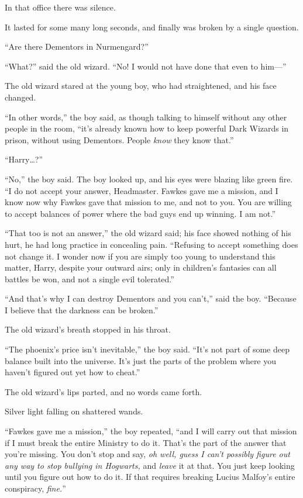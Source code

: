 In that office there was silence.

It lasted for some many long seconds, and finally was broken by a single question.

“Are there Dementors in Nurmengard?”

“What?” said the old wizard. “No! I would not have done that even to him—”

\later

The old wizard stared at the young boy, who had straightened, and his face changed.

“In other words,” the boy said, as though talking to himself without any other people in the room, “it’s already known how to keep powerful Dark Wizards in prison, without using Dementors. People \emph{know} they know that.”

“Harry…?”

“No,” the boy said. The boy looked up, and his eyes were blazing like green fire. “I do not accept your answer, Headmaster. Fawkes gave me a mission, and I know now why Fawkes gave that mission to me, and not to you. You are willing to accept balances of power where the bad guys end up winning. I am not.”

“That too is not an answer,” the old wizard said; his face showed nothing of his hurt, he had long practice in concealing pain. “Refusing to accept something does not change it. I wonder now if you are simply too young to understand this matter, Harry, despite your outward airs; only in children’s fantasies can all battles be won, and not a single evil tolerated.”

“And that’s why I can destroy Dementors and you can’t,” said the boy. “Because I believe that the darkness can be broken.”

The old wizard’s breath stopped in his throat.

“The phoenix’s price isn’t inevitable,” the boy said. “It’s not part of some deep balance built into the universe. It’s just the parts of the problem where you haven’t figured out yet how to cheat.”

The old wizard’s lips parted, and no words came forth.

Silver light falling on shattered wands.

“Fawkes gave me a mission,” the boy repeated, “and I will carry out that mission if I must break the entire Ministry to do it. That’s the part of the answer that you’re missing. You don’t stop and say, \emph{oh well, guess I can’t possibly figure out any way to stop bullying in Hogwarts,} and \emph{leave} it at that. You just keep looking until you figure out how to do it. If that requires breaking Lucius Malfoy’s entire conspiracy, \emph{fine.}”

